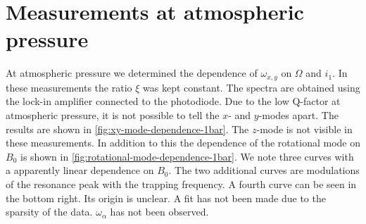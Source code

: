 \section{Measurements at atmospheric pressure}
\label{sec:measurements-at-atmospheric-pressure}
At atmospheric pressure we determined the dependence of $\omega_{x,y}$ on $\Omega$ and $i_1$. In these measurements the ratio $\xi$ was kept constant. The spectra are obtained using the lock-in amplifier connected to the photodiode. Due to the low Q-factor at atmospheric pressure, it is not possible to tell the $x$- and $y$-modes apart. The results are shown in \autoref{fig:xy-mode-dependence-1bar}. The $z$-mode is not visible in these measurements. In addition to this the dependence of the rotational mode on $B_0$ is shown in \autoref{fig:rotational-mode-dependence-1bar}. We note three curves with a apparently linear dependence on $B_0$. The two additional curves are modulations of the resonance peak with the trapping frequency. A fourth curve can be seen in the bottom right. Its origin is unclear. A fit has not been made due to the sparsity of the data. $\omega_\alpha$ has not been observed.

